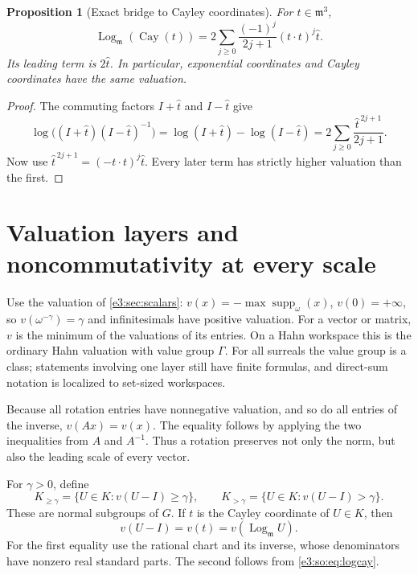 \documentclass[11pt,letterpaper]{article}
\numberwithin{equation}{section}
\newtheorem{proposition}[proposition]{Proposition}
\theoremstyle{definition}
\theoremstyle{remark}
\newcommand{\mm}{\mathfrak m}
\newcommand{\cay}{\operatorname{Cay}}
\newcommand{\Log}{\operatorname{Log}}
\begin{document}
\begin{proposition}[Exact bridge to Cayley coordinates]\label{e3:so:prop:logcay}
For \(t\in\mm^3\),
\begin{equation}\label{e3:so:eq:logcay}
 \Log_{\mm}(\cay(t))
 =2\sum_{j\ge0}\frac{(-1)^j}{2j+1}(t\cdot t)^j\widehat t.
\end{equation}
Its leading term is \(2\widehat t\). In particular, exponential coordinates
and Cayley coordinates have the same valuation.
\end{proposition}
\begin{proof}
The commuting factors \(I+\widehat t\) and \(I-\widehat t\) give
\[
 \log\bigl((I+\widehat t)(I-\widehat t)^{-1}\bigr)
 =\log(I+\widehat t)-\log(I-\widehat t)
 =2\sum_{j\ge0}\frac{\widehat t^{\,2j+1}}{2j+1}.
\]
Now use \(\widehat t^{\,2j+1}=(-t\cdot t)^j\widehat t\).
Every later term has strictly higher valuation than the first.
\end{proof}

\section{Valuation layers and noncommutativity at every scale}\label{e3:so:sec:filtration}

Use the valuation of \cref{e3:sec:scalars}:
\(v(x)=-\max\operatorname{supp}_{\omega}(x)\), \(v(0)=+\infty\),
so \(v(\omega^{-\gamma})=\gamma\) and infinitesimals have positive valuation.
For a vector or matrix, \(v\) is the minimum of the valuations of its entries.
On a Hahn workspace this is the ordinary Hahn valuation with value group
\(\Gamma\). For all surreals the value group is a class; statements involving
one layer still have finite formulas, and direct-sum notation is localized to
set-sized workspaces.

Because all rotation entries have nonnegative valuation, and so do all entries
of the inverse, \(v(Ax)=v(x)\). The equality follows by applying the two
inequalities from \(A\) and \(A^{-1}\). Thus a rotation preserves not only the
norm, but also the leading scale of every vector.

For \(\gamma>0\), define
\begin{equation}\label{e3:so:eq:filtration}
 K_{\ge\gamma}=\{U\in K:v(U-I)\ge\gamma\},\qquad
 K_{>\gamma}=\{U\in K:v(U-I)>\gamma\}.
\end{equation}
These are normal subgroups of \(G\). If \(t\) is the Cayley coordinate of
\(U\in K\), then
\begin{equation}\label{e3:so:eq:valcay}
 v(U-I)=v(t)=v(\Log_{\mm}U).
\end{equation}
For the first equality use the rational chart and its inverse, whose
denominators have nonzero real standard parts. The second follows from
\cref{e3:so:eq:logcay}.
\end{document}
